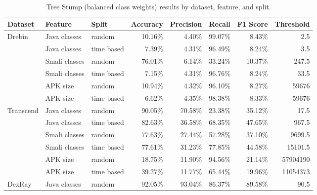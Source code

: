 \begin{table*}[t!]
    \begin{minipage}{1.5\textwidth}
        \captionsetup{width=\textwidth}
        \caption{\label{tab:treestump} Tree Stump (balanced class weights) results by dataset, feature, and split.}
    \end{minipage}
    \small
    {\renewcommand{\arraystretch}{1.5} %
        \begin{tabularx}{\linewidth}{@{}l l l r r r r r@{}} %
            \toprule
            \textbf{Dataset} & \textbf{Feature} & \textbf{Split} & \textbf{Accuracy} & \textbf{Precision} & \textbf{Recall} & \textbf{F1 Score} & \textbf{Threshold} \\
            \midrule
            Drebin & Java classes & random     & 10.16\% & 4.40\% & 99.07\% & 8.43\% & 2.5 \\
                   & Java classes & time based & 7.39\%  & 4.31\% & 96.49\% & 8.24\% & 3.5 \\
                   & Smali classes & random    & 76.01\% & 6.14\% & 33.24\% & 10.37\% & 247.5 \\
                   & Smali classes & time based & 7.15\%  & 4.31\% & 96.76\% & 8.24\% & 33.5 \\
                   & APK size     & random     & 10.94\% & 4.32\% & 96.10\% & 8.27\% & 59676 \\
                   & APK size & time based & 6.62\%  & 4.35\% & 98.38\% & 8.33\% & 59676 \\
            \midrule
            Transcend & Java classes & random     & 90.05\% & 70.58\% & 23.38\% & 35.12\% & 17.5 \\
                         & Java classes & time based & 82.63\% & 36.58\% & 68.35\% & 47.65\% & 967.5 \\
                         & Smali classes & random    & 77.63\% & 27.44\% & 57.28\% & 37.10\% & 9699.5 \\
                         & Smali classes & time based & 77.61\% & 31.23\% & 77.85\% & 44.58\% & 15101.5 \\
                         & APK size     & random     & 18.75\% & 11.90\% & 94.56\% & 21.14\% & 57904190 \\
                         & APK size & time based & 39.27\% & 11.77\% & 65.44\% & 19.96\% & 11054373 \\
            \midrule
            DexRay & Java classes & random     & 92.05\% & 93.04\% & 86.37\% & 89.58\% & 90.5 \\

\end{tabularx}}
\end{table*}

